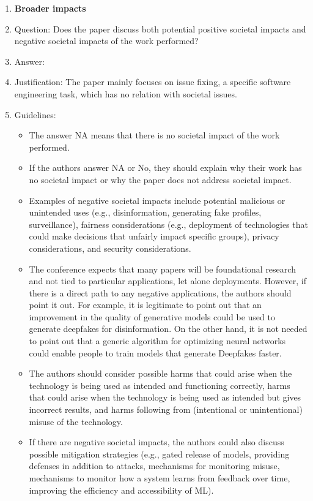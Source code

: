 \begin{enumerate}
\item {\bf Broader impacts}
    \item[] Question: Does the paper discuss both potential positive societal impacts and negative societal impacts of the work performed?
    \item[] Answer: \answerNA{} %
    \item[] Justification: The paper mainly focuses on issue fixing, a specific software engineering task, which has no relation with societal issues.%
    \item[] Guidelines:
    \begin{itemize}
        \item The answer NA means that there is no societal impact of the work performed.
        \item If the authors answer NA or No, they should explain why their work has no societal impact or why the paper does not address societal impact.
        \item Examples of negative societal impacts include potential malicious or unintended uses (e.g., disinformation, generating fake profiles, surveillance), fairness considerations (e.g., deployment of technologies that could make decisions that unfairly impact specific groups), privacy considerations, and security considerations.
        \item The conference expects that many papers will be foundational research and not tied to particular applications, let alone deployments. However, if there is a direct path to any negative applications, the authors should point it out. For example, it is legitimate to point out that an improvement in the quality of generative models could be used to generate deepfakes for disinformation. On the other hand, it is not needed to point out that a generic algorithm for optimizing neural networks could enable people to train models that generate Deepfakes faster.
        \item The authors should consider possible harms that could arise when the technology is being used as intended and functioning correctly, harms that could arise when the technology is being used as intended but gives incorrect results, and harms following from (intentional or unintentional) misuse of the technology.
        \item If there are negative societal impacts, the authors could also discuss possible mitigation strategies (e.g., gated release of models, providing defenses in addition to attacks, mechanisms for monitoring misuse, mechanisms to monitor how a system learns from feedback over time, improving the efficiency and accessibility of ML).
    \end{itemize}
    

\end{enumerate}
